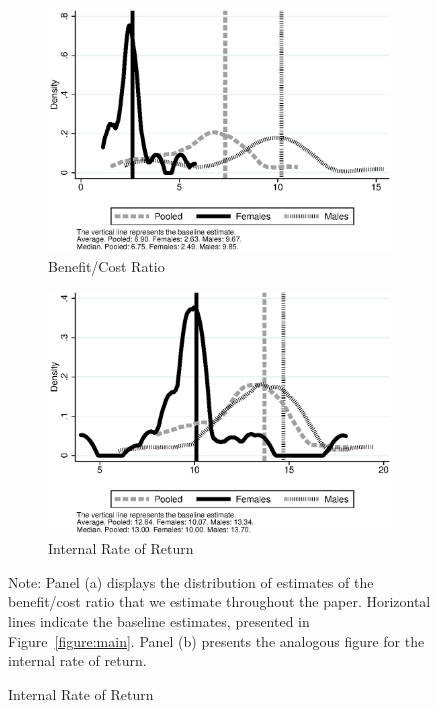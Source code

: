 \begin{figure}
\centering
\caption{Distribution of Benefit/Cost and Internal Rate of Return Estimates}\label{figure:ranges}
\begin{subfigure}[h]{0.49\textwidth}
	\centering
	\caption{Benefit/Cost Ratio} \label{fig:bc}
	\includegraphics[width=\textwidth]{output/overalldist_BCRatio}
\end{subfigure}
\begin{subfigure}[h]{0.49\textwidth}
	\centering
	\caption{Internal Rate of Return} \label{fig:irr}
	\includegraphics[width=\textwidth]{output/overalldist_IRR}
\end{subfigure}%
\footnotesize \justify
Note: Panel (a) displays the distribution of estimates of the benefit/cost ratio that we estimate throughout the paper. Horizontal lines indicate the baseline estimates, presented in Figure~\ref{figure:main}. Panel (b) presents the analogous figure for the internal rate of return.\\
\end{figure}

